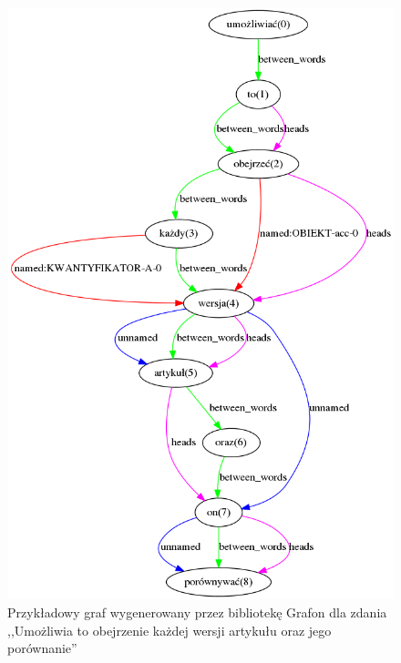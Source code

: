 \documentclass[a4paper, twoside, openright, 12pt]{report}
\begin{document}
        \begin{figure}[h!]
                \centering
                \includegraphics[scale=0.65]{example_grafon_graph}
                \caption{Przykładowy graf wygenerowany przez bibliotekę Grafon dla zdania ,,Umożliwia to obejrzenie każdej
                wersji artykułu oraz jego porównanie''}
                \label{GRAFON_EXAMPLE}
        \end{figure}
\end{document}
